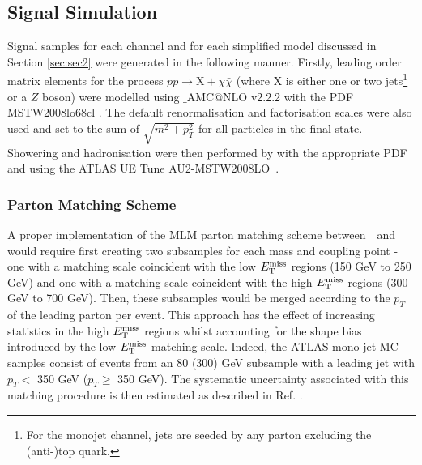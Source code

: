 \subsection{Signal Simulation}
\label{signal_generation}
Signal samples for each channel and for each simplified model discussed in Section \ref{sec:sec2} were generated in the following manner. Firstly, leading order matrix elements for the process $pp \rightarrow \mathrm{X} + \chi\bar{\chi}$ (where X is either one or two jets\footnote{For the monojet channel, jets are seeded by any parton excluding the (anti-)top quark.} or a $Z$ boson) were modelled using \MG$\_${\footnotesize A}MC$@$NLO v2.2.2 \cite{MG_aMCNLO2014} with the PDF MSTW2008lo68cl \cite{MSTW}. The default renormalisation and factorisation scales were also used and set to the sum of $\sqrt{m^{2} + p_{T}^{2}}$ for all particles in the final state. Showering and hadronisation were then performed by  with the appropriate PDF and using the ATLAS UE Tune AU2-MSTW2008LO~\cite{AUtune}.

{}

 
\subsubsection{Parton Matching Scheme}
A proper implementation of the MLM parton matching scheme between \MG$\mbox{ }$and \PYTHIA would require first creating two subsamples for each mass and coupling point - one with a matching scale coincident with the low $E_{\mathrm{T}}^{\mathrm{miss}}$ regions (150 GeV to 250 GeV) and one with a matching scale coincident with the high $E_{\mathrm{T}}^{\mathrm{miss}}$ regions (300 GeV to 700 GeV). Then, these subsamples would be merged according to the $p_{T}$ of the leading parton per event. This approach has the effect of increasing statistics in the high $E_{\mathrm{T}}^{\mathrm{miss}}$ regions whilst accounting for the shape bias introduced by the low $E_{\mathrm{T}}^{\mathrm{miss}}$ matching scale. Indeed, the ATLAS mono-jet MC samples consist of events from an 80 (300) GeV subsample with a leading jet with $p_{T} <$ 350 GeV ($p_{T} \geq$ 350 GeV). The systematic uncertainty associated with this matching procedure is then estimated as described in Ref. \cite{CERN-THESIS-2015-038}.
\bigskip

